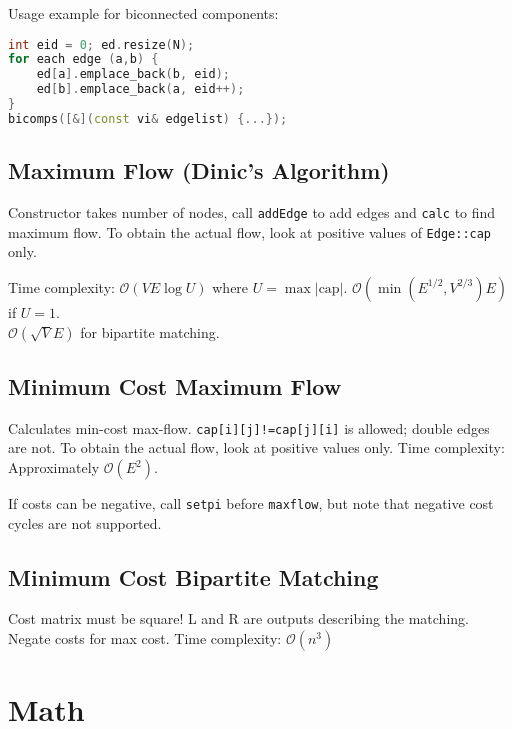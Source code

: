 \documentclass{article}
\begin{document}


Usage example for biconnected components:
\begin{lstlisting}[language=C++]
int eid = 0; ed.resize(N);
for each edge (a,b) {
    ed[a].emplace_back(b, eid);
    ed[b].emplace_back(a, eid++);
}
bicomps([&](const vi& edgelist) {...});
\end{lstlisting}


\subsection*{Maximum Flow (Dinic's Algorithm)}

Constructor takes number of nodes, call \lstinline{addEdge} to add edges and \lstinline{calc} to find maximum flow.
To obtain the actual flow, look at positive values of \lstinline{Edge::cap} only.

Time complexity: $\mathcal{O}(VE\log U)$ where $U = \max |\text{cap}|$.
$\mathcal{O}(\min(E^{1/2}, V^{2/3})E)$ if $U = 1$.\\
$\mathcal{O}(\sqrt{V}E)$ for bipartite matching.


\subsection*{Minimum Cost Maximum Flow}

Calculates min-cost max-flow. \lstinline{cap[i][j]!=cap[j][i]} is allowed; double edges are not. To obtain the actual flow, look at positive values only. Time complexity: Approximately $\mathcal{O}(E^2)$.

If costs can be negative, call \lstinline{setpi} before \lstinline{maxflow}, but note that negative cost cycles are not supported.



\pagebreak

\subsection*{Minimum Cost Bipartite Matching}
Cost matrix must be square! L and R are outputs describing the matching. Negate costs for max cost. Time complexity: $\mathcal{O}(n^3)$


\pagebreak

\section*{Math}
\end{document}
